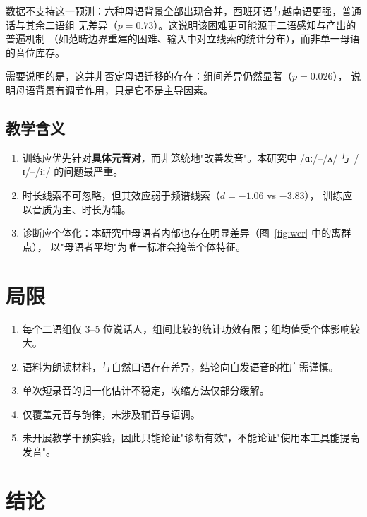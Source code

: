 \documentclass[11pt,a4paper]{ctexart}
\newcommand{\ipa}[1]{/#1/}
\newcommand{\figref}[1]{图~\ref{#1}}
\begin{document}
数据不支持这一预测：六种母语背景全部出现合并，西班牙语与越南语更强，普通话与其余二语组
无差异（$p=0.73$）。这说明该困难更可能源于二语感知与产出的普遍机制
（如范畴边界重建的困难、输入中对立线索的统计分布），而非单一母语的音位库存。

需要说明的是，这并非否定母语迁移的存在：组间差异仍然显著（$p=0.026$），
说明母语背景有调节作用，只是它不是主导因素。

\subsection{教学含义}

\begin{enumerate}[leftmargin=2em,itemsep=2pt]
  \item 训练应优先针对\textbf{具体元音对}，而非笼统地"改善发音"。本研究中
        \ipa{ɑː}–\ipa{ʌ} 与 \ipa{ɪ}–\ipa{iː} 的问题最严重。
  \item 时长线索不可忽略，但其效应弱于频谱线索（$d=-1.06$ vs $-3.83$），
        训练应以音质为主、时长为辅。
  \item 诊断应个体化：本研究中母语者内部也存在明显差异（\figref{fig:wer} 中的离群点），
        以"母语者平均"为唯一标准会掩盖个体特征。
\end{enumerate}

\section{局限}

\begin{enumerate}[leftmargin=2em,itemsep=2pt]
  \item 每个二语组仅 3--5 位说话人，组间比较的统计功效有限；组均值受个体影响较大。
  \item 语料为朗读材料，与自然口语存在差异，结论向自发语音的推广需谨慎。
  \item 单次短录音的归一化估计不稳定，收缩方法仅部分缓解。
  \item 仅覆盖元音与韵律，未涉及辅音与语调。
  \item 未开展教学干预实验，因此只能论证"诊断有效"，不能论证"使用本工具能提高发音"。
\end{enumerate}

\section{结论}
\end{document}
